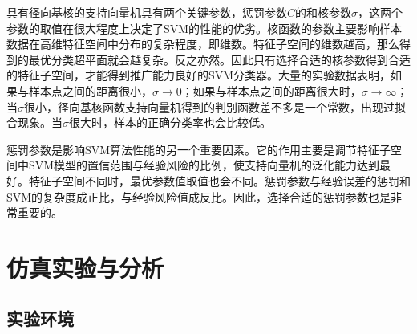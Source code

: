 具有径向基核的支持向量机具有两个关键参数，惩罚参数$C$的和核参数$\sigma$，这两个参数的取值在很大程度上决定了SVM的性能的优劣。核函数的参数主要影响样本数据在高维特征空间中分布的复杂程度，即维数。特征子空间的维数越高，那么得到的最优分类超平面就会越复杂。反之亦然。因此只有选择合适的核参数得到合适的特征子空间，才能得到推广能力良好的SVM分类器。大量的实验数据表明，如果与样本点之间的距离很小，$\sigma \rightarrow 0$；如果与样本点之间的距离很大时，$\sigma \rightarrow \infty$；当$\sigma$很小，径向基核函数支持向量机得到的判别函数差不多是一个常数，出现过拟合现象。当$\sigma$很大时，样本的正确分类率也会比较低。

惩罚参数是影响SVM算法性能的另一个重要因素。它的作用主要是调节特征子空间中SVM模型的置信范围与经验风险的比例，使支持向量机的泛化能力达到最好。特征子空间不同时，最优参数值取值也会不同。惩罚参数与经验误差的惩罚和SVM的复杂度成正比，与经验风险值成反比。因此，选择合适的惩罚参数也是非常重要的。

\section{仿真实验与分析}
\subsection{实验环境}


